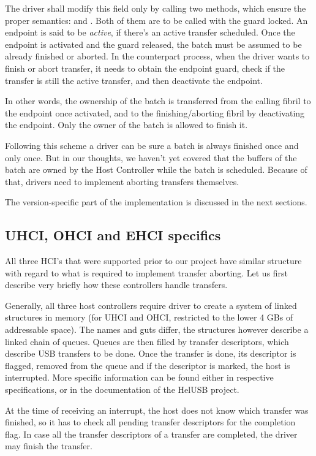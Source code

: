 The driver shall modify this field only by calling two methods, which ensure
the proper semantics:  and .
Both of them are to be called with the guard locked. An endpoint is said to be
\emph{active}, if there's an active transfer scheduled. Once the endpoint is
activated and the guard released, the batch must be assumed to be already
finished or aborted. In the counterpart process, when the driver wants to
finish or abort transfer, it needs to obtain the endpoint guard, check if the
transfer is still the active transfer, and then deactivate the endpoint.

In other words, the ownership of the batch is transferred from the calling
fibril to the endpoint once activated, and to the finishing/aborting fibril by
deactivating the endpoint. Only the owner of the batch is allowed to finish it.

Following this scheme a driver can be sure a batch is always finished once and
only once. But in our thoughts, we haven't yet covered that the buffers of the
batch are owned by the Host Controller while the batch is scheduled. Because of
that, drivers need to implement aborting transfers themselves.

The version-specific part of the implementation is discussed in the next sections.


\subsection{UHCI, OHCI and EHCI specifics}

All three HCI's that were supported prior to our project have similar
structure with regard to what is required to implement transfer aborting. Let us
first describe very briefly how these controllers handle transfers.

Generally, all three host controllers require driver to create a system of
linked structures in memory (for UHCI and OHCI, restricted to the lower 4 GBs
of addressable space). The names and guts differ, the structures however
describe a linked chain of queues. Queues are then filled by transfer
descriptors, which describe USB transfers to be done. Once the transfer is
done, its descriptor is flagged, removed from the queue and if the descriptor
is marked, the host is interrupted. More specific information can be found
either in respective specifications, or in the documentation of the HelUSB
project.

At the time of receiving an interrupt, the host does not know which transfer
was finished, so it has to check all pending transfer descriptors for the
completion flag. In case all the transfer descriptors of a transfer are
completed, the driver may finish the transfer.

